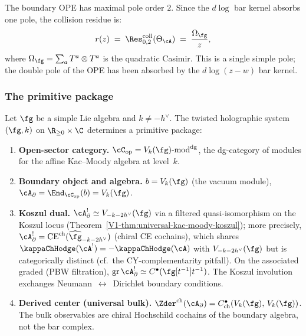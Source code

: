 The boundary OPE has maximal pole order $2$. Since the
$d\log$ bar kernel absorbs one pole, the collision residue is:
\begin{equation}\label{eq:tw-hol-r-matrix}
r(z)
\;=\;
\Res^{\mathrm{coll}}_{0,2}(\Theta_\cA)
\;=\;
\frac{\Omega_\fg}{z},
\end{equation}
where $\Omega_\fg = \sum_a T^a \otimes T^a$ is the
quadratic Casimir. This is a single simple pole; the double pole
of the OPE has been absorbed by the $d\log(z-w)$ bar kernel.

\subsubsection{The primitive package}

\begin{theorem}
\label{thm:tw-hol-primitive-package}
Let $\fg$ be a simple Lie algebra and $k \ne -h^\vee$. The
twisted holographic system $(\fg, k)$ on $\R_{\ge 0} \times \C$
determines a primitive package:
\begin{enumerate}[label=\textup{(\roman*)},nosep]
\item \textbf{Open-sector category.}
 $\cC_{\mathrm{op}} = V_k(\fg)\text{-}\mathrm{mod}^{\mathrm{dg}}$,
 the dg-category of modules for the affine Kac--Moody algebra at
 level~$k$.

\item \textbf{Boundary object and algebra.}
 $b = V_k(\fg)$ \textup{(}the vacuum module\textup{)},
 $\cA_\partial = \End_{\cC_{\mathrm{op}}}(b) = V_k(\fg)$.

\item \textbf{Koszul dual.}
 $\cA_\partial^! \simeq V_{-k-2h^\vee}(\fg)$ via a filtered
 quasi-isomorphism on the Koszul locus
 \textup{(}Theorem~\ref*{V1-thm:universal-kac-moody-koszul}\textup{)};
 more precisely, $\cA_\partial^! = \mathrm{CE}^{\mathrm{ch}}(\widehat\fg_{-k-2h^\vee})$
 \textup{(}chiral CE cochains\textup{)}, which shares
 $\kappaChHodge(\cA^!) = -\kappaChHodge(\cA)$ with $V_{-k-2h^\vee}(\fg)$
 but is categorically distinct (cf.\ the CY-complementarity pitfall).
 On the associated graded \textup{(}PBW filtration\textup{)},
 $\operatorname{gr}\cA_\partial^! \simeq C^\bullet(\fg[t^{-1}]t^{-1})$.
 The Koszul involution exchanges Neumann~$\leftrightarrow$~Dirichlet
 boundary conditions.

\item \textbf{Derived center \textup{(}universal bulk\textup{)}.}
 $\Zder^{\mathrm{ch}}(\cA_\partial)
 = C^\bullet_{\mathrm{ch}}(V_k(\fg),\, V_k(\fg))$.
 The bulk observables are chiral Hochschild cochains of the boundary
 algebra, not the bar complex.


\end{enumerate}
\end{theorem}
